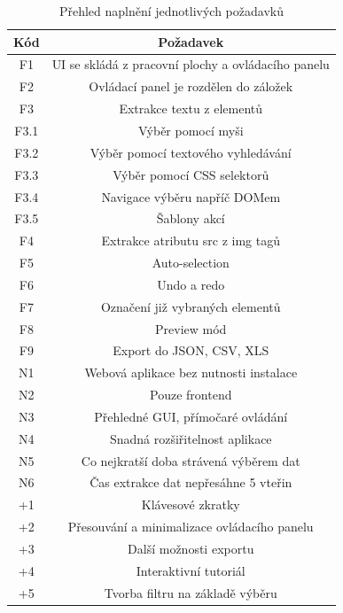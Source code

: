 \documentclass[thesis=B,czech]{FITthesis}[2012/06/26]
\begin{document}
\begin{table}
	\centering
	\caption{Přehled naplnění jednotlivých požadavků}
	\label{table:requirements}
	\begin{tabular}{ | c | c | }
		\hline
		Kód & Požadavek \\
		\hline
		\rowcolor{lightgreen}
		F1 & UI se skládá z pracovní plochy a ovládacího panelu \\
		\rowcolor{lightgreen}
		F2 & Ovládací panel je rozdělen do záložek \\
		\rowcolor{lightgreen}
		F3 & Extrakce textu z elementů \\
		\rowcolor{lightgreen}
		F3.1 & Výběr pomocí myši \\
		\rowcolor{lightgreen}
		F3.2 & Výběr pomocí textového vyhledávání \\
		\rowcolor{lightgreen}
		F3.3 & Výběr pomocí CSS selektorů \\
		\rowcolor{lightgreen}
		F3.4 & Navigace výběru napříč DOMem \\
		\rowcolor{lightgreen}
		F3.5 & Šablony akcí \\
		\rowcolor{lightgreen}
		F4 & Extrakce atributu \textsf{src} z img tagů \\
		\rowcolor{lightgreen}
		F5 & Auto-selection \\
		\rowcolor{lightgreen}
		F6 & Undo a redo \\
		\rowcolor{lightgreen}
		F7 & Označení již vybraných elementů \\
		\rowcolor{lightgreen}
		F8 & Preview mód \\
		\rowcolor{lightyellow}
		F9 & Export do JSON, CSV, XLS \\
		\hline
		\rowcolor{lightred}
		N1 & Webová aplikace bez nutnosti instalace \\
		\rowcolor{lightgreen}
		N2 & Pouze frontend \\
		\rowcolor{lightgreen}
		N3 & Přehledné GUI, přímočaré ovládání \\
		\rowcolor{lightgreen}
		N4 & Snadná rozšiřitelnost aplikace \\
		\rowcolor{lightgreen}
		N5 & Co nejkratší doba strávená výběrem dat \\
		\rowcolor{lightgreen}
		N6 & Čas extrakce dat nepřesáhne 5 vteřin \\
		\hline
		\rowcolor{lightred}
		+1 & Klávesové zkratky \\
		\rowcolor{lightgreen}
		+2 & Přesouvání a minimalizace ovládacího panelu \\
		\rowcolor{lightred}
		+3 & Další možnosti exportu \\
		\rowcolor{lightyellow}
		+4 & Interaktivní tutoriál \\
		\rowcolor{lightred}
		+5 & Tvorba filtru na základě výběru \\
		\hline
	\end{tabular}
\end{table}
\end{document}
